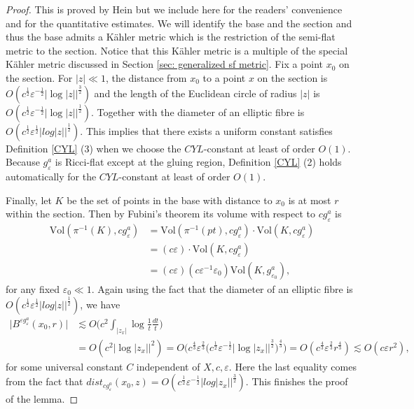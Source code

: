 \documentclass[11pt]{amsart}
\theoremstyle{plain}
\theoremstyle{definition}
\numberwithin{equation}{section}
\renewcommand{\epsilon}{\varepsilon}
\begin{document}
\begin{proof}
	This is proved by Hein \cite[p.379]{Hein} but we include here for the readers' convenience and for the quantitative estimates. We will identify the base and the section and thus the base admits a K\"ahler metric which is the restriction of the semi-flat metric to the section. Notice that this K\"ahler metric is a multiple of the special K\"ahler metric discussed in Section \ref{sec: generalized sf metric}. Fix a point $x_0$ on the section. 
	For $|z|\ll 1$, the distance from $x_0$ to a point $x$ on the section is $O(c^{\frac{1}{2}}\epsilon^{-\frac{1}{2}}|\log{|z|}|^{\frac{3}{2}})$ and the length of the Euclidean circle of radius $|z|$ is $O(c^{\frac{1}{2}}\epsilon^{-\frac{1}{2}}|\log{|z|}|^{\frac{1}{2}})$. Together with the diameter of an elliptic fibre is $O(c^{\frac{1}{2}}\epsilon^{\frac{1}{2}}|log{|z|}|^{\frac{1}{2}})$.	
	This implies that there exists a uniform constant satisfies Definition \ref{CYL} (3) when we choose the $CYL$-constant at least of order $O(1)$. Because $g^a_{\epsilon}$ is Ricci-flat except at the gluing region, Definition \ref{CYL} (2) holds automatically for the $CYL$-constant at least of order $O(1)$. 
	
Finally, let $K$ be the set of points in the base with distance to $x_0$ is at most $r$ within the section. Then by Fubini's theorem its volume with respect to $cg^a_{\epsilon}$ is 
	 \begin{align*}
	 	 \mbox{Vol}(\pi^{-1}(K),cg^a_{\epsilon})&=\mbox{Vol}(\pi^{-1}(pt),cg^a_{\epsilon})\cdot \mbox{Vol}(K,cg^{a}_{\epsilon})\\
	 	                                        &=(c\epsilon)\cdot \mbox{Vol}(K,cg^{a}_{\epsilon})\\
	 	                                        &=(c\epsilon) (c\epsilon^{-1} \epsilon_0) \mbox{Vol}(K, g_{\epsilon_0}^a),
	 \end{align*}  for any fixed $\epsilon_0\ll 1$. Again using the fact that the diameter of an elliptic fibre is $O(c^{\frac{1}{2}}\epsilon^{\frac{1}{2}}|log{|z|}|^{\frac{1}{2}})$, we have
    \begin{align*}
    	\big|B^{\epsilon g^a_{\epsilon}}(x_0,r)\big|&\lesssim O\bigg(c^2 \int_{|z_x|} \log{\frac{1}{t}}\frac{dt}{t}\bigg)\\
    	&=O(c^2 |\log{|z_x|}|^2)=O\bigg(c^{\frac{4}{3}}\varepsilon^{\frac{2}{3}} \big(c^{\frac{1}{2}}\varepsilon^{-\frac{1}{2}}|\log{|z_x|}|^\frac{3}{2}\big)^{\frac{4}{3}} \bigg)= O(c^{\frac{4}{3}}\varepsilon^{\frac{2}{3}} r^{\frac{4}{3}})\lesssim O(c\varepsilon r^2),
    \end{align*} for some universal constant $C$ independent of $X,c,\epsilon$. Here the last equality comes from the fact that  $dist_{cg^a_{\epsilon}}(x_0,z)=O(c^{\frac{1}{2}}\epsilon^{-\frac{1}{2}}|log{|z_x|}|^{\frac{3}{2}})$. This finishes the proof of the lemma. 
	
	
\end{proof}
\end{document}

